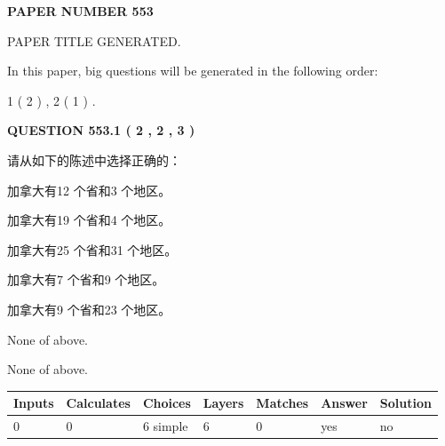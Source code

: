 \documentclass{ctexart}
\begin{document}
   
 {\textbf{ \Large{ PAPER NUMBER  553  }}}
   
   
\vspace{0.2in}
   
   
   
   
   
   
   
   
 \vspace{0.2in}
 
 
 
 
   
   
 PAPER TITLE GENERATED.
   
   
   
\vspace{0.2in}
   
In this paper, big questions will be generated in the following order: 
   
   
   1 ( 2 )
 ,
   2 ( 1 )
 .
  
\vspace{0.2in}
  
{\textbf{\Large{QUESTION
553.1 
 ( 2 , 2 , 3 )
}}}
  
  
请从如下的陈述中选择正确的：
 
 
加拿大有12 个省和3 个地区。
 
 
加拿大有19 个省和4 个地区。
 
 
加拿大有25 个省和31 个地区。
 
 
加拿大有7 个省和9 个地区。
 
 
加拿大有9 个省和23 个地区。
 
 
 None of above.
 
 
\noindent{}
 
 
 None of above.
 
 
\noindent{}
 
 
   
   
   
   
\noindent\begin{tabular}{|l|l|l|l|l|l|l|}
 \hline
Inputs & Calculates & Choices & Layers & Matches & Answer & Solution \\ \hline
 0  & 
 0  & 
 6
  simple  
  & 
 6  & 
 0  & 
  yes & 
  no 
  \\ \hline
 \end{tabular}
   
\end{document}
